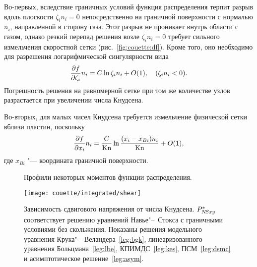 Во-первых, вследствие граничных условий функция распределения терпит разрыв вдоль плоскости \(\zeta_in_i=0\)
непосредственно на граничной поверхности с нормалью \(n_i\), направленной в сторону газа.
Этот разрыв не проникает внутрь области с газом, однако резкий перепад решения возле \(\zeta_in_i=0\)
требует сильного измельчения скоростной сетки (рис.~\ref{fig:couette:df}).
Кроме того, оно необходимо для разрешения логарифмической сингулярности вида~\autocite{Takata2016}
\begin{equation*}
    \pder[f]{\zeta_i}n_i = C\ln\zeta_in_i + \OO{1}, \quad (\zeta_in_i<0).
\end{equation*}
Погрешность решения на равномерной сетке при том же количестве узлов
разрастается при увеличении числа Кнудсена.

Во-вторых, для малых чисел Кнудсена требуется измельчение физической сетки вблизи пластин, поскольку~\autocite{Takata2014}
\begin{equation*}
    \pder[f]{x_i}n_i = \frac{C}{\Kn}\ln\frac{(x_i-x_{Bi})n_i}{\Kn} + \OO{1},
\end{equation*}
где \(x_{Bi}\) "--- координата граничной поверхности.

\begin{figure}
    \centering
    \caption{Профили некоторых моментов функции распределения.}
    \label{fig:couette:profiles}
\end{figure}

\begin{figure}
    \centering
    \texttt{[image: couette/integrated/shear]}
    \caption{Зависимость сдвигового напряжения от числа Кнудсена.
        \(P_{\NS xy}^*\) соответствует решению уравнений Навье"--~Стокса с граничными условиями без скольжения.
        Показаны решения модельного уравнения Крука"--~Веландера~\ref{leg:bgk},
        линеаризованного уравнения Больцмана~\ref{leg:lbe},
        КПИМДС~\ref{leg:kes}, ПСМ~\ref{leg:dsmc} и асимптотическое решение~\ref{leg:asym}.}
    \label{fig:couette:shear}
\end{figure}

